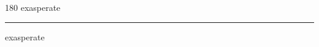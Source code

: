 
\begin{frame}
\begin{center}
\begin{turn}{180}
{\fontsize{2.5cm}{1em}\selectfont exasperate}
\end{turn}
\vspace{1em}\par  
\hrule
\vspace{1em}\par  
{\fontsize{2.5cm}{1em}\selectfont exasperate}
\end{center}
\end{frame}
